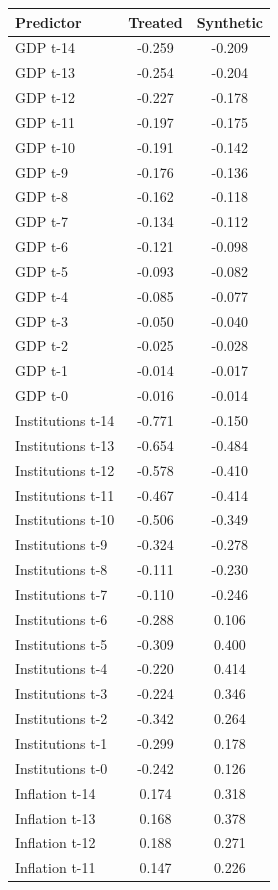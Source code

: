 \begin{tabular}{lcc}
\hline\hline
Predictor & Treated & Synthetic \\
\hline
GDP t-14 & -0.259 & -0.209 \\
GDP t-13 & -0.254 & -0.204 \\
GDP t-12 & -0.227 & -0.178 \\
GDP t-11 & -0.197 & -0.175 \\
GDP t-10 & -0.191 & -0.142 \\
GDP t-9 & -0.176 & -0.136 \\
GDP t-8 & -0.162 & -0.118 \\
GDP t-7 & -0.134 & -0.112 \\
GDP t-6 & -0.121 & -0.098 \\
GDP t-5 & -0.093 & -0.082 \\
GDP t-4 & -0.085 & -0.077 \\
GDP t-3 & -0.050 & -0.040 \\
GDP t-2 & -0.025 & -0.028 \\
GDP t-1 & -0.014 & -0.017 \\
GDP t-0 & -0.016 & -0.014 \\
Institutions t-14 & -0.771 & -0.150 \\
Institutions t-13 & -0.654 & -0.484 \\
Institutions t-12 & -0.578 & -0.410 \\
Institutions t-11 & -0.467 & -0.414 \\
Institutions t-10 & -0.506 & -0.349 \\
Institutions t-9 & -0.324 & -0.278 \\
Institutions t-8 & -0.111 & -0.230 \\
Institutions t-7 & -0.110 & -0.246 \\
Institutions t-6 & -0.288 & 0.106 \\
Institutions t-5 & -0.309 & 0.400 \\
Institutions t-4 & -0.220 & 0.414 \\
Institutions t-3 & -0.224 & 0.346 \\
Institutions t-2 & -0.342 & 0.264 \\
Institutions t-1 & -0.299 & 0.178 \\
Institutions t-0 & -0.242 & 0.126 \\
Inflation t-14 & 0.174 & 0.318 \\
Inflation t-13 & 0.168 & 0.378 \\
Inflation t-12 & 0.188 & 0.271 \\
Inflation t-11 & 0.147 & 0.226 \\

\end{tabular}
